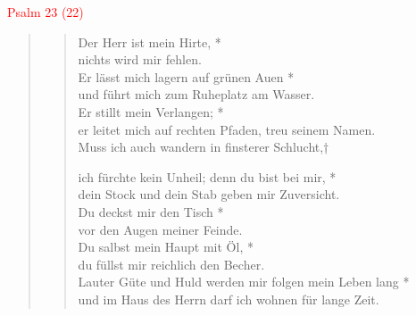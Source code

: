 
\begin{center}
 \textcolor{red}{Psalm 23 (22)}
\end{center}
\begin{quote}
 


\begin{verse}
Der Herr ist mein Hirte, *\\

        nichts wird mir fehlen.\\

\vin Er lässt mich lagern auf grünen Auen *\\

        \vin und führt mich zum Ruheplatz am Wasser.\\

Er stillt mein Verlangen; *\\

        er leitet mich auf rechten Pfaden, treu seinem Namen.\\

\vin Muss ich auch wandern in finsterer Schlucht,†

        \vin ich fürchte kein Unheil; denn du bist bei mir, *\\ \vin dein Stock und dein Stab geben mir Zuversicht.\\

Du deckst mir den Tisch *\\

        vor den Augen meiner Feinde.\\ 
        \vin Du salbst mein Haupt mit Öl, *\\ \vin du füllst mir reichlich den Becher.\\

Lauter Güte und Huld werden mir folgen mein Leben lang *\\

        und im Haus des Herrn darf ich wohnen für lange Zeit.\\
\end{verse}

\end{quote}
\vspace{1cm}


